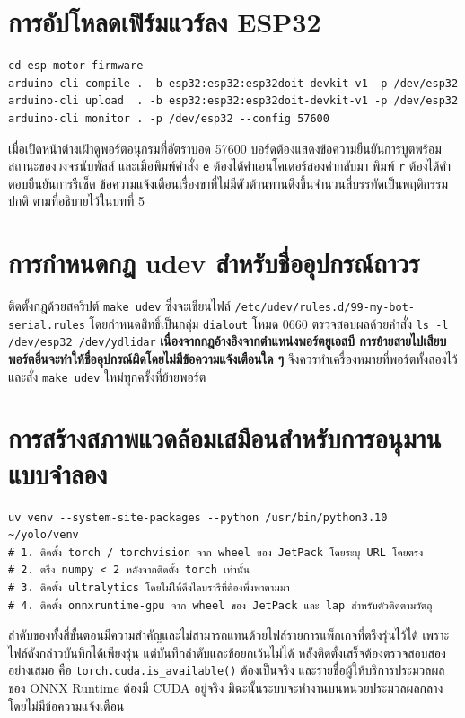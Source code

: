 \documentclass[a4paper,12pt]{report}
\begin{document}
\section{การอัปโหลดเฟิร์มแวร์ลง ESP32}

{\small
\begin{verbatim}
cd esp-motor-firmware
arduino-cli compile . -b esp32:esp32:esp32doit-devkit-v1 -p /dev/esp32
arduino-cli upload  . -b esp32:esp32:esp32doit-devkit-v1 -p /dev/esp32
arduino-cli monitor . -p /dev/esp32 --config 57600
\end{verbatim}
}

เมื่อเปิดหน้าต่างเฝ้าดูพอร์ตอนุกรมที่อัตราบอด 57600
บอร์ดต้องแสดงข้อความยืนยันการบูตพร้อมสถานะของวงจรนับพัลส์
และเมื่อพิมพ์คำสั่ง \texttt{e} ต้องได้ค่าเอนโคเดอร์สองค่ากลับมา
พิมพ์ \texttt{r} ต้องได้คำตอบยืนยันการรีเซ็ต
ข้อความแจ้งเตือนเรื่องขาที่ไม่มีตัวต้านทานดึงขึ้นจำนวนสี่บรรทัดเป็นพฤติกรรมปกติ
ตามที่อธิบายไว้ในบทที่ 5

\section{การกำหนดกฎ udev สำหรับชื่ออุปกรณ์ถาวร}

ติดตั้งกฎด้วยสคริปต์ \texttt{make udev} ซึ่งจะเขียนไฟล์
\texttt{/etc/udev/rules.d/99-my-bot-serial.rules}
โดยกำหนดสิทธิ์เป็นกลุ่ม \texttt{dialout} โหมด 0660
ตรวจสอบผลด้วยคำสั่ง \texttt{ls -l /dev/esp32 /dev/ydlidar}
\textbf{เนื่องจากกฎอ้างอิงจากตำแหน่งพอร์ตยูเอสบี
การย้ายสายไปเสียบพอร์ตอื่นจะทำให้ชื่ออุปกรณ์ผิดโดยไม่มีข้อความแจ้งเตือนใด ๆ}
จึงควรทำเครื่องหมายที่พอร์ตทั้งสองไว้ และสั่ง \texttt{make udev} ใหม่ทุกครั้งที่ย้ายพอร์ต

\section{การสร้างสภาพแวดล้อมเสมือนสำหรับการอนุมานแบบจำลอง}

{\small
\begin{verbatim}
uv venv --system-site-packages --python /usr/bin/python3.10 ~/yolo/venv
# 1. ติดตั้ง torch / torchvision จาก wheel ของ JetPack โดยระบุ URL โดยตรง
# 2. ตรึง numpy < 2 หลังจากติดตั้ง torch เท่านั้น
# 3. ติดตั้ง ultralytics โดยไม่ให้ดึงไลบรารีที่ต้องพึ่งพาตามมา
# 4. ติดตั้ง onnxruntime-gpu จาก wheel ของ JetPack และ lap สำหรับตัวติดตามวัตถุ
\end{verbatim}
}

ลำดับของทั้งสี่ขั้นตอนมีความสำคัญและไม่สามารถแทนด้วยไฟล์รายการแพ็กเกจที่ตรึงรุ่นไว้ได้
เพราะไฟล์ดังกล่าวบันทึกได้เพียงรุ่น แต่บันทึกลำดับและข้อยกเว้นไม่ได้
หลังติดตั้งเสร็จต้องตรวจสอบสองอย่างเสมอ
คือ \texttt{torch.cuda.is\_available()} ต้องเป็นจริง
และรายชื่อผู้ให้บริการประมวลผลของ ONNX Runtime ต้องมี CUDA อยู่จริง
มิฉะนั้นระบบจะทำงานบนหน่วยประมวลผลกลางโดยไม่มีข้อความแจ้งเตือน
\end{document}
